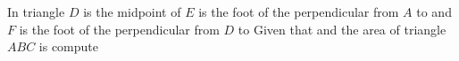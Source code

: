 In triangle  $D$ is the midpoint of  $E$ is the foot of the perpendicular from $A$ to  and $F$ is the foot of the perpendicular from $D$ to   Given that   and the area of triangle $ABC$ is  compute 